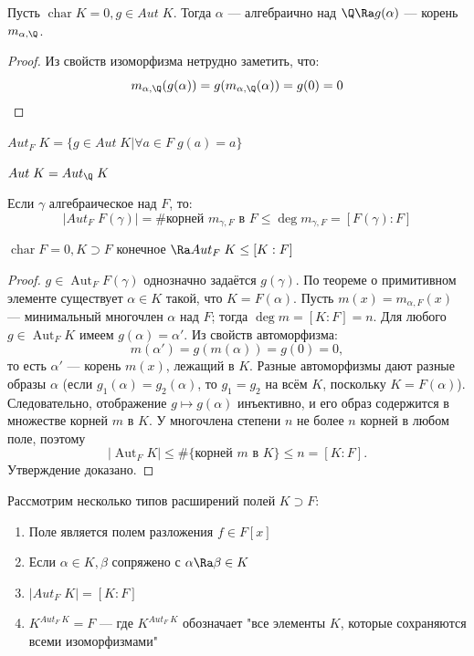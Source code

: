 \begin{proposition}
    Пусть \(\operatorname{char} K = 0, g \in Aut\;K\). Тогда \(\alpha\) --- алгебраично над \(\Q \Ra g(\alpha)\) --- корень \(m_{\alpha, \Q}\).
\end{proposition}
\begin{proof}
    Из свойств изоморфизма нетрудно заметить, что:
    \[m_{\alpha, \Q}(g(\alpha)) = g(m_{\alpha, \Q}(\alpha)) = g(0) = 0\]
\end{proof}

\begin{definition}
    \(Aut_F\;K = \{g \in Aut\;K | \forall a \in F\;g(a) = a\}\)
\end{definition}

\begin{note}
    \(Aut\;K = Aut_\Q\;K\)
\end{note}

\begin{note}
    Если \(\gamma\) алгебраическое над \(F\), то:
    \[|Aut_F\;F(\gamma)| = \#\text{корней }m_{\gamma, F}\text{ в }F \le \deg m_{\gamma, F} = [F(\gamma):F]\]
\end{note}

\begin{corollary}
    \(\operatorname{char} F = 0, K \supset F\) конечное \(\Ra Aut_F\;K \le [K:F]\)
\end{corollary}
\begin{proof}
    \(g \in \operatorname{Aut}_F F(\gamma)\) однозначно задаётся \(g(\gamma)\).  
    По теореме о примитивном элементе существует \(\alpha \in K\) такой, что \(K = F(\alpha)\). Пусть \(m(x) = m_{\alpha,F}(x)\) — минимальный многочлен \(\alpha\) над \(F\); тогда \(\deg m = [K:F] = n\).  
    Для любого \(g \in \operatorname{Aut}_F K\) имеем \(g(\alpha) = \alpha'\). Из свойств автоморфизма:
    \[
    m(\alpha') = g(m(\alpha)) = g(0) = 0,
    \]
    то есть \(\alpha'\) — корень \(m(x)\), лежащий в \(K\). Разные автоморфизмы дают разные образы \(\alpha\) (если \(g_1(\alpha)=g_2(\alpha)\), то \(g_1=g_2\) на всём \(K\), поскольку \(K=F(\alpha)\)). Следовательно, отображение \(g \mapsto g(\alpha)\) инъективно, и его образ содержится в множестве корней \(m\) в \(K\). У многочлена степени \(n\) не более \(n\) корней в любом поле, поэтому
    \[
    |\operatorname{Aut}_F K| \le \#\{\text{корней } m \text{ в } K\} \le n = [K:F].
    \]
    Утверждение доказано.
\end{proof}


Рассмотрим несколько типов расширений полей \(K \supset F\):
\begin{enumerate}
    \item Поле является полем разложения \(f \in F[x]\)
    \item Если \(\alpha \in K, \beta\) сопряжено с \(\alpha \Ra \beta \in K\)
    \item \(|Aut_F\;K| = [K:F]\)
    \item \(K^{Aut_F\:K} = F\) --- где \(K^{Aut_F\:K}\) обозначает "все элементы \(K\), которые сохраняются всеми изоморфизмами"
\end{enumerate}

